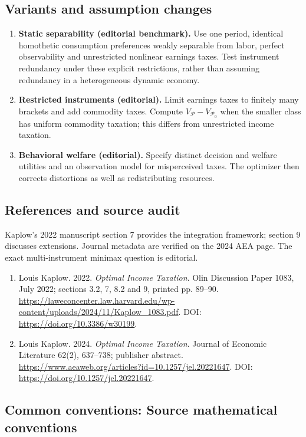 \documentclass[11pt,a4paper]{article}
\begin{document}
\subsection*{Variants and assumption changes}
\begin{enumerate}
\item \textbf{Static separability (editorial benchmark).} Use one period, identical homothetic consumption preferences weakly separable from labor, perfect observability and unrestricted nonlinear earnings taxes. Test instrument redundancy under these explicit restrictions, rather than assuming redundancy in a heterogeneous dynamic economy.
\item \textbf{Restricted instruments (editorial).} Limit earnings taxes to finitely many brackets and add commodity taxes. Compute \(V_{\mathcal P}-V_{\mathcal P_0}\) when the smaller class has uniform commodity taxation; this differs from unrestricted income taxation.
\item \textbf{Behavioral welfare (editorial).} Specify distinct decision and welfare utilities and an observation model for misperceived taxes. The optimizer then corrects distortions as well as redistributing resources.
\end{enumerate}
\subsection*{References and source audit}
Kaplow's 2022 manuscript section 7 provides the integration framework; section 9 discusses extensions. Journal metadata are verified on the 2024 AEA page. The exact multi-instrument minimax question is editorial.
\begin{enumerate}\raggedright
\item\hypertarget{definitions:source:30007753:1}{} Louis Kaplow. 2022. \emph{Optimal Income Taxation}. Olin Discussion Paper 1083, July 2022; sections 3.2, 7, 8.2 and 9, printed pp. 89–90.
\url{https://laweconcenter.law.harvard.edu/wp-content/uploads/2024/11/Kaplow_1083.pdf}.
DOI: \url{https://doi.org/10.3386/w30199}.
\item\hypertarget{definitions:source:30007753:2}{} Louis Kaplow. 2024. \emph{Optimal Income Taxation}. Journal of Economic Literature 62(2), 637–738; publisher abstract.
\url{https://www.aeaweb.org/articles?id=10.1257/jel.20221647}.
DOI: \url{https://doi.org/10.1257/jel.20221647}.
\end{enumerate}

\subsection*{Common conventions: Source mathematical conventions}
\end{document}
